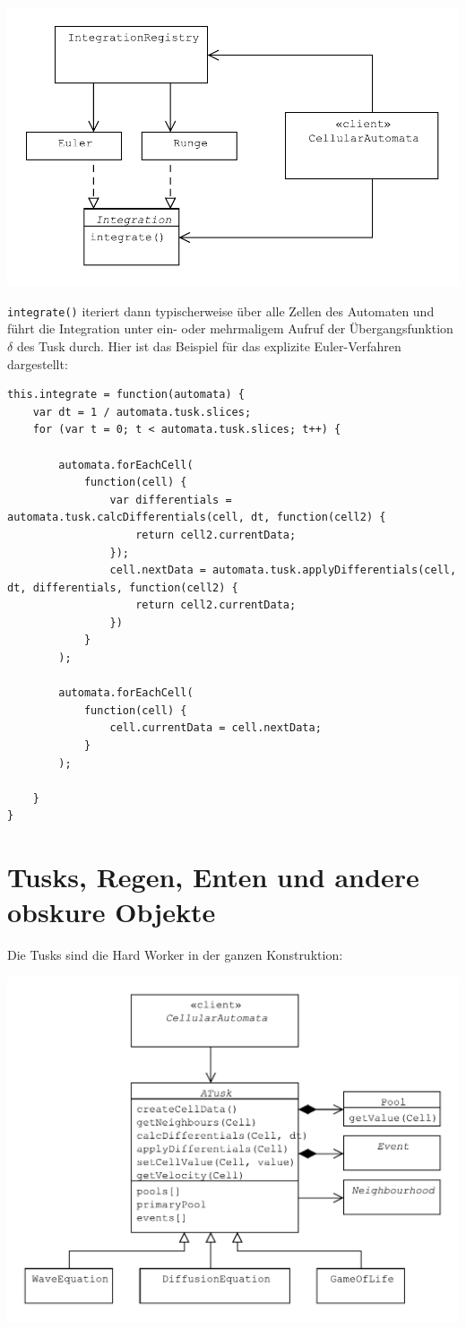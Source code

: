 \documentclass[11pt]{report} %
\theoremstyle{definition}
\begin{document}
\includegraphics[scale=0.7]{uml/Integration.pdf}

{\tt integrate()} iteriert dann typischerweise über alle Zellen des Automaten und führt die Integration unter ein- oder mehrmaligem Aufruf der Übergangsfunktion $\delta$ des Tusk durch. Hier ist das Beispiel für das explizite Euler-Verfahren dargestellt:

\begin{lstlisting}
this.integrate = function(automata) {
	var dt = 1 / automata.tusk.slices;
	for (var t = 0; t < automata.tusk.slices; t++) {
		
		automata.forEachCell(
			function(cell) {
				var differentials = automata.tusk.calcDifferentials(cell, dt, function(cell2) {
					return cell2.currentData;
				});
				cell.nextData = automata.tusk.applyDifferentials(cell, dt, differentials, function(cell2) {
					return cell2.currentData;
				})
			}
		);
		
		automata.forEachCell(
			function(cell) {
				cell.currentData = cell.nextData;
			}
		);
		
	}
}
\end{lstlisting}


\section{Tusks, Regen, Enten und andere obskure Objekte}

Die Tusks sind die Hard Worker in der ganzen Konstruktion:

\includegraphics[scale=0.7]{uml/Tusk.pdf}
\end{document}
